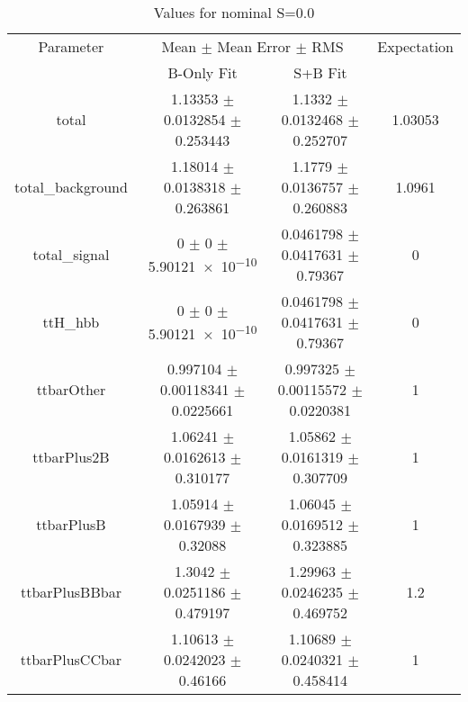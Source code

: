 \begin{table}
\centering
\caption{Values for nominal S=0.0}
\begin{tabular}{cccc}
\toprule
Parameter & \multicolumn{2}{c}{Mean $\pm$ Mean Error $\pm$ RMS} & Expectation\\
 & B-Only Fit & S+B Fit & \\
\midrule
total & \num{1.13353} $\pm$ \num{0.0132854} $\pm$ \num{0.253443} & \num{1.1332} $\pm$ \num{0.0132468} $\pm$ \num{0.252707} & \num{1.03053}\\
total\_background & \num{1.18014} $\pm$ \num{0.0138318} $\pm$ \num{0.263861} & \num{1.1779} $\pm$ \num{0.0136757} $\pm$ \num{0.260883} & \num{1.0961}\\
total\_signal & \num{0} $\pm$ \num{0} $\pm$ \num{5.90121e-10} & \num{0.0461798} $\pm$ \num{0.0417631} $\pm$ \num{0.79367} & \num{0}\\
ttH\_hbb & \num{0} $\pm$ \num{0} $\pm$ \num{5.90121e-10} & \num{0.0461798} $\pm$ \num{0.0417631} $\pm$ \num{0.79367} & \num{0}\\
ttbarOther & \num{0.997104} $\pm$ \num{0.00118341} $\pm$ \num{0.0225661} & \num{0.997325} $\pm$ \num{0.00115572} $\pm$ \num{0.0220381} & \num{1}\\
ttbarPlus2B & \num{1.06241} $\pm$ \num{0.0162613} $\pm$ \num{0.310177} & \num{1.05862} $\pm$ \num{0.0161319} $\pm$ \num{0.307709} & \num{1}\\
ttbarPlusB & \num{1.05914} $\pm$ \num{0.0167939} $\pm$ \num{0.32088} & \num{1.06045} $\pm$ \num{0.0169512} $\pm$ \num{0.323885} & \num{1}\\
ttbarPlusBBbar & \num{1.3042} $\pm$ \num{0.0251186} $\pm$ \num{0.479197} & \num{1.29963} $\pm$ \num{0.0246235} $\pm$ \num{0.469752} & \num{1.2}\\
ttbarPlusCCbar & \num{1.10613} $\pm$ \num{0.0242023} $\pm$ \num{0.46166} & \num{1.10689} $\pm$ \num{0.0240321} $\pm$ \num{0.458414} & \num{1}\\
\bottomrule
\end{tabular}
\end{table}